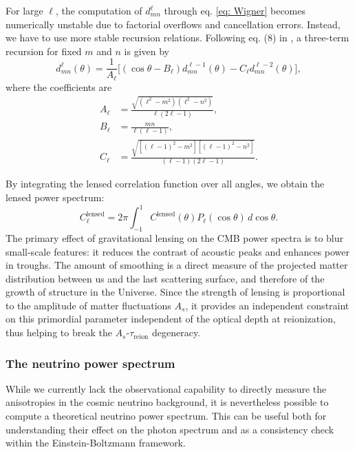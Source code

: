 \documentclass{aa}
\numberwithin{equation}{section}
\numberwithin{table}{section}
\numberwithin{figure}{section}
\begin{document}
For large $\ell$, the computation of $d^\ell_{mn}$ through eq. \eqref{eq: Wigner} becomes numerically unstable due to factorial overflows and cancellation errors. Instead, we have to use more stable recursion relations. Following eq. (8) in \cite{Wigner}, a three-term recursion for fixed $m$ and $n$ is given by
\begin{equation}
  d_{mn}^{\ell}(\theta) = \frac{1}{A_\ell}\Big[\left(\cos\theta - B_\ell\right)d_{mn}^{\ell-1}(\theta) - C_\ell d_{mn}^{\ell-2}(\theta)\Big], \label{eq: recursive}
\end{equation}
where the coefficients are
\begin{align}
  A_\ell &= \frac{\sqrt{(\ell^2 - m^2)(\ell^2 - n^2)}}{\ell(2\ell - 1)}, 
  \\
  B_\ell &= \frac{mn}{\ell(\ell - 1)}, 
  \\
  C_\ell &= \frac{\sqrt{[(\ell-1)^2 - m^2][(\ell-1)^2 - n^2]}}{(\ell-1)(2\ell - 1)}. \label{eq: C}
\end{align}

By integrating the lensed correlation function over all angles, we obtain the lensed power spectrum:
\begin{equation}
C_\ell^{\text{lensed}} = 2\pi \int_{-1}^{1} C^\text{lensed}(\theta) P_\ell(\cos\theta) \, d\cos\theta. \label{eq: lensed Cell}
\end{equation}
The primary effect of gravitational lensing on the CMB power spectra is to blur small-scale features: it reduces the contrast of acoustic peaks and enhances power in troughs. The amount of smoothing is a direct measure of the projected matter distribution between us and the last scattering surface, and therefore of the growth of structure in the Universe. Since the strength of lensing is proportional to the amplitude of matter fluctuations $A_s$, it provides an independent constraint on this primordial parameter independent of the optical depth at reionization, thus helping to break the $A_s$-$\tau_\text{reion}$ degeneracy. 





\subsubsection{The neutrino power spectrum}
While we currently lack the observational capability to directly measure the anisotropies in the cosmic neutrino background, it is nevertheless possible to compute a theoretical neutrino power spectrum. This can be useful both for understanding their effect on the photon spectrum and as a consistency check within the Einstein-Boltzmann framework.
\end{document}
